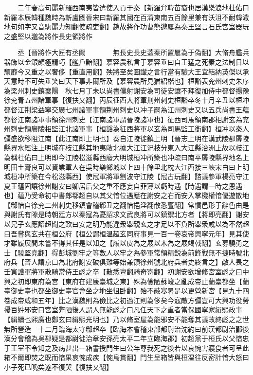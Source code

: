 　　二年春高句麗新羅西南夷皆遣使入貢于秦【新羅弁韓苗裔也居漢樂浪地杜佑曰新羅本辰韓種魏時為斬盧國晉宋曰新羅其國在百濟東南五百餘里兼有沃沮不耐韓濊地句如字又音駒麗力知翻使疏吏翻】趙故將作功曹熊邈屢為秦王堅言石氏宮室器玩之盛堅以邈為將作長史領將作

　　丞【晉將作大匠有丞闕　　　　無長史長史蓋秦所置屢為于偽翻】大脩舟艦兵器飾以金銀頗極精巧【艦戶黯翻】慕容農私言于慕容垂曰自王猛之死秦之法制日以頹靡今又重之以奢侈【重直用翻】殃將至矣圖䜟之言行當有驗大王宜結納英傑以承天意時不可失垂笑曰天下事非爾所及【慕容農所見猶紹楷也】桓豁表兖州刺史朱序為梁州刺史鎮襄陽　秋七月丁未以尚書僕射謝安為司徒安讓不拜復加侍中都督揚豫徐兖青五州諸軍事【復扶又翻】丙辰征西大將軍荆州刺史桓豁卒冬十月辛丑以桓冲都督江荆梁益寧交廣七州諸軍事領荆州刺史以冲子嗣為江州刺史又以五兵尚書王藴都督江南諸軍事領徐州刺史【江南諸軍謂晉陵諸軍也】征西司馬領南郡相謝玄為兖州刺史領廣陵相監江北諸軍事【桓豁為征西將軍以玄為司馬監工銜翻】桓冲以秦人彊盛欲移阻江南【此江南即上明也】奏自江陵徙鎮上明【晉志上明在漢武陵郡孱陵縣界水經注上明城在枝江縣其地夷敞北據大江江汜枝分東入大江縣治洲上故以枝江為稱杜佑曰上明即今江陵松滋縣西廢大明城桓冲所築也冲疏曰南平孱陵縣界地名上明田土膏良可以資業軍人在吳時樂鄉城以上四十餘里北枕大江西接三峽宋白曰上明城桓冲所築在今松滋縣西】使冠軍將軍劉波守江陵【冠古玩翻】諮議參軍楊亮守江夏王藴固讓徐州謝安曰卿居后父之重不應妄自菲薄以虧時遇【時遇謂一時之恩遇也】藴乃受命初中書郎郗超自以其父愔位遇應在謝安之右而安入掌機權愔優遊散地【郗愔自徐兖二州刺史移鎮會稽郗丑之翻愔挹淫翻散悉亶翻】常憤邑形于辭色由是與謝氏有隙是時朝廷方以秦寇為憂詔求文武良將可以鎮禦北方者【將即亮翻】謝安以兄子玄應詔超聞之歎曰安之明乃能違衆舉親玄之才足以不負所舉衆咸以為不然超曰吾嘗與玄共在桓公府【桓公謂桓温超玄同府事見一百一卷哀帝興寧元年】見其使才雖履展間未嘗不得其任是以知之【履以皮為之屐以木為之屐竭戟翻】玄募驍勇之士【驍堅堯翻】得彭城劉牢之等數人以牢之為參軍常領精鋭為前鋒戰無不捷時號北府兵【晉人謂京口為北府謝安破俱難等始兼領徐州號北府兵者史終言之】敵人畏之　壬寅護軍將軍散騎常侍王彪之卒【散悉亶翻騎奇寄翻】初謝安欲增修宮室彪之曰中興之初即東府為宮【東府在建康臺城之東】殊為儉陋蘇峻之亂成帝止蘭臺都坐【蘭臺御史臺也都坐御史臺官會坐之地坐徂卧翻】殆不蔽寒暑是以更營新宮【見九十四卷成帝咸和五年】比之漢魏則為儉比之初過江則為侈矣今寇敵方彊豈可大興功役勞擾百姓邪安曰宮室弊陋後人謂人無能彪之曰凡任天下之重者當保國寧家緝熙政事【緝續也熙廣也鄭玄曰緝熙光明也】乃以脩室屋為能邪安不能奪其議故終彪之之世無所營造　十二月臨海太守郗超卒【臨海本會稽東部都尉治沈約曰前漢都尉治鄞後漢分會稽為吳郡疑是都尉徙治章安孫亮太平二年立臨海郡】初超黨于桓氏以父愔忠于王室不令知之及病甚出一箱書授門生曰公年尊我死之後若以哀惋害寢食者可呈此箱不爾即焚之既而愔果哀惋成疾【惋烏貫翻】門生呈箱皆與桓温往反密計愔大怒曰小子死已晩矣遂不復哭【復扶又翻】

